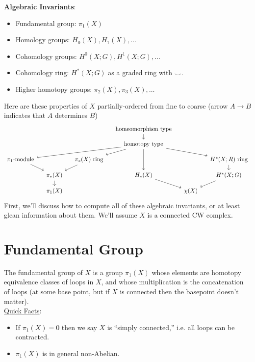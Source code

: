 \documentclass{amsart}
\begin{document}
	\textbf{Algebraic Invariants}:
	\begin{itemize}
		\item Fundamental group: $\pi_1(X)$
		\item Homology groups: $H_0(X),H_1(X),\dots$
		\item Cohomology groups: $H^0(X;G),H^1(X;G),\dots$
		\item Cohomology ring: $H^*(X;G)$ as a graded ring with $\smile$.
		\item Higher homotopy groups: $\pi_2(X),\pi_3(X),\dots$
	\end{itemize}
	Here are these properties of $X$ partially-ordered from fine to coarse (arrow $A\to B$ indicates that $A$ determines $B$)
	$$
	\begin{tikzcd}[sep=small]
		&&& {\text{homeomorphism type}} \\
		&&& {\text{homotopy type}} \\
		{\pi_1\text{-module}} && {\pi_*(X) \text{ ring}} &&& {H^*(X;R)\text{ ring}} \\
		& {\pi_*(X)} && {H_*(X)} && {H^*(X;G)} \\
		& {\pi_1(X)} &&& {\chi(X)}
		\arrow[from=1-4, to=2-4]
		\arrow[from=2-4, to=3-1]
		\arrow[from=2-4, to=3-3]
		\arrow[from=2-4, to=3-6]
		\arrow[from=2-4, to=4-4]
		\arrow[from=3-1, to=4-2]
		\arrow[from=3-3, to=4-2]
		\arrow[from=3-6, to=4-6]
		\arrow[from=4-2, to=5-2]
		\arrow[from=4-4, to=5-5]
		\arrow[from=4-6, to=5-5]
	\end{tikzcd}
	$$
	First, we'll discuss how to compute all of these algebraic invariants, or at least glean information about them. We'll assume $X$ is a connected CW complex.\\
	
	\newpage
	\section{Fundamental Group}
	
	The fundamental group of $X$ is a group $\pi_1(X)$ whose elements are homotopy equivalence classes of loops in $X$, and whose multiplication is the concatenation of loops (at some base point, but if $X$ is connected then the basepoint doesn't matter).\\
	
	\underline{Quick Facts}:
	\begin{itemize}
		\item If $\pi_1(X)=0$ then we say $X$ is ``simply connected,'' i.e. all loops can be contracted.
		\item $\pi_1(X)$ is in general non-Abelian.
	\end{itemize}
	
\end{document}
